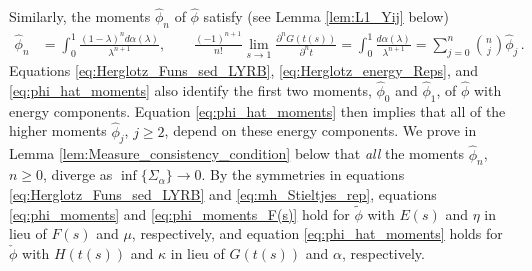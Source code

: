 \documentclass[english,12pt,jmp,graphicx]{revtex4-1}
\newcommand{\ph}{\hat{\phi}}
\begin{document}
Similarly, the moments $\ph_n$ of $\ph$
satisfy (see Lemma \ref{lem:L1_Yij} below)
%
\begin{align}\label{eq:phi_hat_moments}
  \ph_n%
      &=\int_0^1\frac{(1-\lambda)^nd\alpha(\lambda)}{\lambda^{n+1}}, \qquad
      \frac{(-1)^{n+1}}{n!}\lim_{s\to1}\frac{\partial^nG(t(s))}{\partial^nt}
         =\int_0^1\frac{d\alpha(\lambda)}{\lambda^{n+1}}
          =\sum_{j=0}^n{n \choose j} \ph_j\,.
\end{align}
%
Equations
\eqref{eq:Herglotz_Funs_sed_LYRB}, \eqref{eq:Herglotz_energy_Reps},
and \eqref{eq:phi_hat_moments} 
also identify the first two moments, $\ph_0$ and $\ph_1$, of
$\ph$ with energy components. Equation \eqref{eq:phi_hat_moments} then
implies that all of the higher moments $\ph_j$, $j\geq2$, depend on these
energy components. We prove in Lemma
\ref{lem:Measure_consistency_condition} below that \emph{all} the
moments $\ph_n$, $n\geq0$, diverge as
$\inf\{\Sigma_\alpha\}\to0$.
By the symmetries in equations 
\eqref{eq:Herglotz_Funs_sed_LYRB} and \eqref{eq:mh_Stieltjes_rep},
equations \eqref{eq:phi_moments} and \eqref{eq:phi_moments_F(s)} hold for
$\tilde{\phi}$ with $E(s)$ and $\eta$ in lieu of $F(s)$ and $\mu$,
respectively, and equation \eqref{eq:phi_hat_moments} holds for
$\check{\phi}$ with $H(t(s))$ and $\kappa$ in lieu of $G(t(s))$ and $\alpha$,
respectively.
\end{document}

